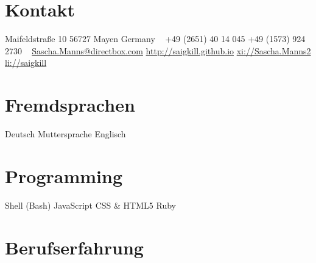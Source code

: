 \documentclass[a4paper,latin]{friggeri-cv} %
\begin{document}




\begin{aside} %
\section{Kontakt}
Maifeldstraße 10
56727 Mayen
Germany
~
+49 (2651) 40 14 045
+49 (1573) 924 2730
~
\href{mailto:Sascha.Manns@directbox.com}{Sascha.Manns@directbox.com}
\href{http://saigkill.github.io}{http://saigkill.github.io}
\href{https://www.xing.com/profile/Sascha_Manns2}{xi://Sascha.Manns2}
\href{http://de.linkedin.com/in/saigkill}{li://saigkill} 
\section{Fremdsprachen}
Deutsch Muttersprache
Englisch
\section{Programming}
{Shell (Bash)}
{JavaScript}
{CSS \& HTML5}
{Ruby}
\end{aside}


\section{Berufserfahrung}
\end{document}
